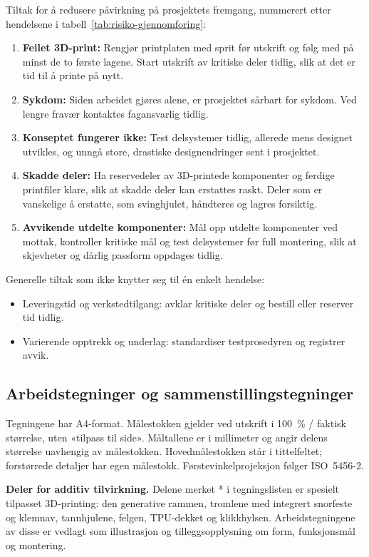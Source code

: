 Tiltak for å redusere påvirkning på prosjektets fremgang, nummerert etter hendelsene i tabell~\ref{tab:risiko-gjennomforing}:
\begin{enumerate}
    \item \textbf{Feilet 3D-print:} Rengjør printplaten med sprit før utskrift og følg med på minst de to første lagene. Start utskrift av kritiske deler tidlig, slik at det er tid til å printe på nytt.
    \item \textbf{Sykdom:} Siden arbeidet gjøres alene, er prosjektet sårbart for sykdom. Ved lengre fravær kontaktes fagansvarlig tidlig.
    \item \textbf{Konseptet fungerer ikke:} Test delsystemer tidlig, allerede mens designet utvikles, og unngå store, drastiske designendringer sent i prosjektet.
    \item \textbf{Skadde deler:} Ha reservedeler av 3D-printede komponenter og ferdige printfiler klare, slik at skadde deler kan erstattes raskt. Deler som er vanskelige å erstatte, som svinghjulet, håndteres og lagres forsiktig.
    \item \textbf{Avvikende utdelte komponenter:} Mål opp utdelte komponenter ved mottak, kontroller kritiske mål og test delsystemer før full montering, slik at skjevheter og dårlig passform oppdages tidlig.
\end{enumerate}
Generelle tiltak som ikke knytter seg til én enkelt hendelse:
\begin{itemize}
    \item Leveringstid og verkstedtilgang: avklar kritiske deler og bestill eller reserver tid tidlig.
    \item Varierende opptrekk og underlag: standardiser testprosedyren og registrer avvik.
\end{itemize}

\clearpage
\subsection{Arbeidstegninger og sammenstillingstegninger}
\label{app:tegninger}
Tegningene har A4-format. Målestokken gjelder ved utskrift i 100~\% / faktisk størrelse, uten «tilpass til side». Måltallene er i millimeter og angir delens størrelse uavhengig av målestokken. Hovedmålestokken står i tittelfeltet; forstørrede detaljer har egen målestokk. Førstevinkelprojeksjon følger ISO~5456-2.

\textbf{Deler for additiv tilvirkning.} Delene merket * i tegningslisten er spesielt tilpasset 3D-printing: den generative rammen, tromlene med integrert snorfeste og klemnav, tannhjulene, felgen, TPU-dekket og klikkhylsen. Arbeidstegningene av disse er vedlagt som illustrasjon og tilleggsopplysning om form, funksjonsmål og montering.

